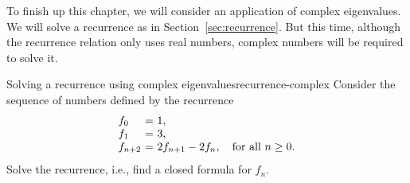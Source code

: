 To finish up this chapter, we will consider an application of complex
eigenvalues. We will solve a recurrence as in
Section~\ref{sec:recurrence}. But this time, although the recurrence
relation only uses real numbers, complex numbers will be required to
solve it.

\begin{example}{Solving a recurrence using complex eigenvalues}{recurrence-complex}
  Consider the sequence of numbers defined by the recurrence
  \begin{equation*}
    \begin{array}{l@{~}c@{~}l}
      f_0 &=& 1, \\
      f_1 &=& 3, \\
      f_{n+2} &=& 2f_{n+1} - 2f_n, \quad\mbox{for all $n\geq 0$.} \\
    \end{array}
  \end{equation*}
  Solve the recurrence, i.e., find a closed formula for $f_n$.
\end{example}

